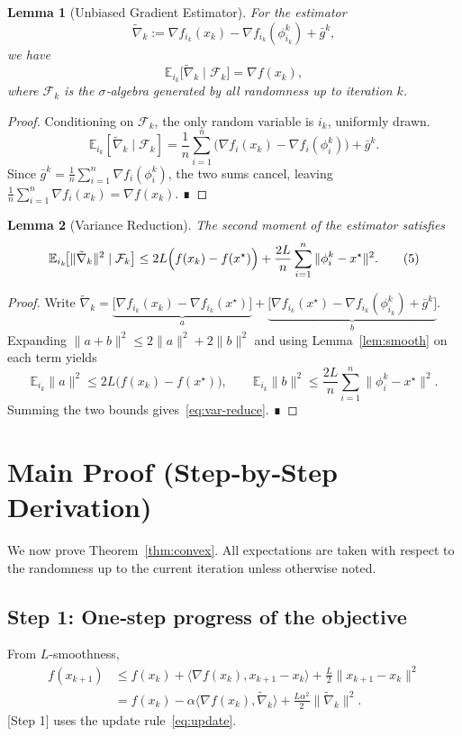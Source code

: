 \documentclass{article}
\newtheorem{lemma}{Lemma}[section]
\begin{document}
\begin{lemma}[Unbiased Gradient Estimator]\label{lem:unbiased}
For the estimator 
\[
\tilde\nabla_k:=\nabla f_{i_k}(x_k)-\nabla f_{i_k}(\phi_{i_k}^{k})+\bar g^{k},
\]
we have
\[
\mathbb{E}_{i_k}\bigl[\tilde\nabla_k\mid \mathcal{F}_k\bigr]=\nabla f(x_k),
\tag{4}
\]
where $\mathcal{F}_k$ is the $\sigma$‑algebra generated by all randomness up to iteration $k$.
\end{lemma}
\begin{proof}
Conditioning on $\mathcal{F}_k$, the only random variable is $i_k$, uniformly drawn.
\[
\mathbb{E}_{i_k}[\tilde\nabla_k\mid\mathcal{F}_k]
= \frac1n\sum_{i=1}^{n}\bigl(\nabla f_i(x_k)-\nabla f_i(\phi_i^{k})\bigr)
   +\bar g^{k}.
\]
Since $\bar g^{k}= \frac1n\sum_{i=1}^{n}\nabla f_i(\phi_i^{k})$, the two sums cancel, leaving
$\frac1n\sum_{i=1}^{n}\nabla f_i(x_k)=\nabla f(x_k)$. ∎
\end{proof}

\begin{lemma}[Variance Reduction]\label{lem:var-reduce}
The second moment of the estimator satisfies
\[
\mathbb{E}_{i_k}\!\bigl[\|\tilde\nabla_k\|^{2}\mid\mathcal{F}_k\bigr]
\le 2L\Bigl(f(x_k)-f(x^\star)\Bigr)
   +\frac{2L}{n}\sum_{i=1}^{n}\|\phi_i^{k}-x^\star\|^{2}.
\tag{5}
\]
\end{lemma}
\begin{proof}
Write $\tilde\nabla_k = \underbrace{\bigl[\nabla f_{i_k}(x_k)-\nabla f_{i_k}(x^\star)\bigr]}_{a}
                         +\underbrace{\bigl[\nabla f_{i_k}(x^\star)-\nabla f_{i_k}(\phi_{i_k}^{k})+\bar g^{k}\bigr]}_{b}$.
Expanding $\|a+b\|^{2}\le 2\|a\|^{2}+2\|b\|^{2}$ and using Lemma~\ref{lem:smooth} on each term yields
\[
\mathbb{E}_{i_k}\|a\|^{2}\le 2L\bigl(f(x_k)-f(x^\star)\bigr),
\qquad
\mathbb{E}_{i_k}\|b\|^{2}\le\frac{2L}{n}\sum_{i=1}^{n}\|\phi_i^{k}-x^\star\|^{2}.
\]
Summing the two bounds gives~\eqref{eq:var-reduce}. ∎
\end{proof}

\section{Main Proof (Step‑by‑Step Derivation)}
We now prove Theorem~\ref{thm:convex}. All expectations are taken with respect to the randomness up to the current iteration unless otherwise noted.

\subsection*{Step 1: One‑step progress of the objective}
From $L$‑smoothness,
\begin{align}
f(x_{k+1})
&\le f(x_k)+\langle\nabla f(x_k),x_{k+1}-x_k\rangle+\frac{L}{2}\|x_{k+1}-x_k\|^{2}\nonumber\\
&= f(x_k)-\alpha\langle\nabla f(x_k),\tilde\nabla_k\rangle
    +\frac{L\alpha^{2}}{2}\|\tilde\nabla_k\|^{2}.
\tag{6}
\end{align}
[Step 1] uses the update rule~\eqref{eq:update}.
\end{document}
